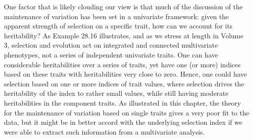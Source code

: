 \documentclass{article}
\begin{document}
One factor that is likely clouding our view is that much of the discussion of the maintenance of variation has been set in a univariate framework: given the apparent strength of selection on a specific trait, how can we account for its heritability? As Example 28.16 illustrates, and as we stress at length in Volume 3, selection and evolution act on integrated and connected multivariate phenotypes, not a series of independent univariate traits. One can have considerable heritabilities over a series of traits, yet have one (or more) indices based on these traits with heritabilities very close to zero. Hence, one could have selection based on one or more indices of trait values, where selection drives the heritability of the index to rather small values, while still having moderate heritabilities in the component traits. As illustrated in this chapter, the theory for the maintenance of variation based on single traits gives a very poor fit to the data, but it might be in better accord with the underlying selection index if we were able to extract such information from a multivariate analysis.
\end{document}
